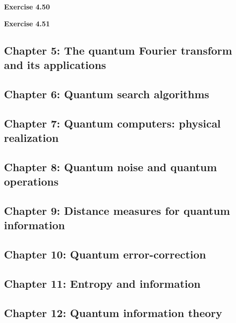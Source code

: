\documentclass{article}
\begin{document}
\bigskip

\begin{framed}
    \noindent \textbf{Exercise 4.50}
    
    \medskip
    
    
\end{framed}


\bigskip

\begin{framed}
    \noindent \textbf{Exercise 4.51}
    
    \medskip
    
    
\end{framed}

\subsection*{Chapter 5: The quantum Fourier transform and its applications}
\subsection*{Chapter 6: Quantum search algorithms}
\subsection*{Chapter 7: Quantum computers: physical realization}
\subsection*{Chapter 8: Quantum noise and quantum operations}
\subsection*{Chapter 9: Distance measures for quantum information }
\subsection*{Chapter 10: Quantum error-correction}
\subsection*{Chapter 11: Entropy and information}
\subsection*{Chapter 12: Quantum information theory }
\end{document}
